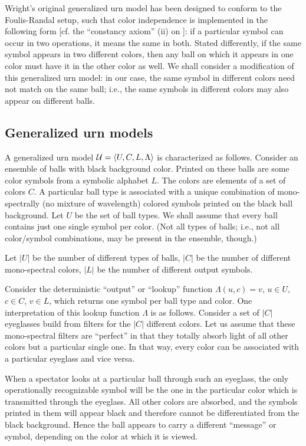 Wright's original generalized urn model has been designed to conform to the Foulis-Randal setup,
such that color independence is implemented in the following form
[cf. the ``constancy axiom'' (ii) on \cite[p. 889]{wright}]:
if  a particular symbol can occur in two operations, it means the same in both.
Stated differently, if the same symbol appears in two different colors, then any ball
on which it appears in one color must have it in the other color as well.
We shall consider a modification of this generalized urn model: in
our case, the same symbol in different colors need not match on the same ball; i.e.,
the same symbols in different colors may also appear on different balls.

\subsection{Generalized urn models}
A generalized urn model
${\cal U}=\langle U,C,L,\Lambda \rangle $ is
characterized as follows.
Consider an ensemble of balls with black background color.
Printed on these balls are some color symbols from a symbolic alphabet $L$.
The colors are elements of a set of colors $C$.
A particular ball type is associated with a unique combination of mono-spectrally
(no mixture of wavelength) colored symbols
printed on the black ball background.
Let $U$ be the set of ball types.
We shall assume that every ball contains
just one single symbol per color.
(Not all types of balls; i.e., not all color/symbol combinations, may be present in
the ensemble, though.)

Let
$\vert U\vert $ be the number of different types of balls,
$\vert C\vert $ be the number of different mono-spectral colors,
$\vert L\vert $ be the number of different output symbols.

Consider the deterministic ``output'' or ``lookup''
function $\Lambda (u,c)=v$,
$u\in U$,
$c\in C$,
$v\in L$,
which returns one symbol per ball type and color.
One interpretation of this lookup function $\Lambda$ is as follows.
Consider a set of $\vert C\vert $ eyeglasses build from filters for the
$\vert C\vert $ different colors.
Let us assume that these mono-spectral filters are
``perfect'' in that they totally absorb light of all other colors
but a particular single one.
In that way, every color can be associated with a particular eyeglass and vice versa.

When a spectator looks at a particular ball through such an eyeglass,
the only operationally recognizable symbol will be the one in the particular
color which is transmitted through the eyeglass.
All other colors are absorbed, and the symbols printed in them will appear black
and therefore cannot be differentiated from the black background.
Hence the ball appears to carry a different ``message'' or symbol,
depending on the color at which it is viewed.

